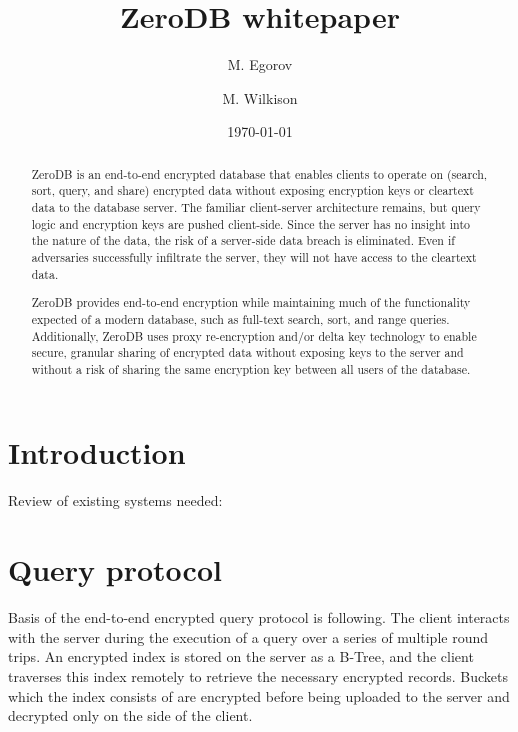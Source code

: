 \documentclass[notitlepage]{revtex4-1}
\begin{document}
\title{ZeroDB whitepaper}

\author{M. Egorov}
\author{M. Wilkison}

\begin{abstract}
ZeroDB is an end-to-end encrypted database that enables clients to operate on (search, sort, query, and share) encrypted data without exposing encryption keys or cleartext data to the database server.
The familiar client-server architecture remains, but query logic and encryption keys are pushed client-side.
Since the server has no insight into the nature of the data, the risk of a server-side data breach is eliminated.
Even if adversaries successfully infiltrate the server, they will not have access to the cleartext data.

ZeroDB provides end-to-end encryption while maintaining much of the functionality expected of a modern database, such as full-text search, sort, and range queries.
Additionally, ZeroDB uses proxy re-encryption and/or delta key technology to enable secure, granular sharing of encrypted data without exposing keys to the server and without a risk of sharing the same encryption key between all users of the database.
\end{abstract}

\date{\today}
\maketitle

\section{Introduction}

Review of existing systems needed:~\cite{cipherbase}~\cite{cryptdb}~\cite{gentry}

\section{Query protocol}

Basis of the end-to-end encrypted query protocol is following.
The client interacts with the server during the execution of a query over a series of multiple round trips.
An encrypted index is stored on the server as a B-Tree, and the client traverses this index remotely to retrieve the necessary encrypted records.
Buckets which the index consists of are encrypted before being uploaded to the server and decrypted only on the side of the client.
\end{document}
